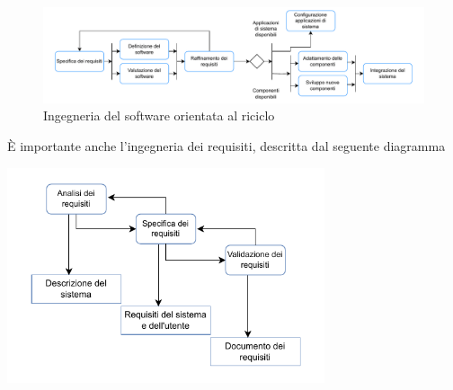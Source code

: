 \documentclass[10pt, letterpaper]{report}
\begin{document}
\begin{center}
    \begin{figure}[h!]
        \centering 
        \includegraphics[width=1\textwidth ]{images/IngegneriaRiuso.pdf}
        \caption{Ingegneria del software orientata al riciclo}
    \end{figure}\end{center}
È importante anche l'ingegneria dei requisiti, descritta dal seguente diagramma\begin{center}
    \includegraphics[width=0.7\textwidth ]{images/reqEng.pdf}
\end{center}
\end{document}
